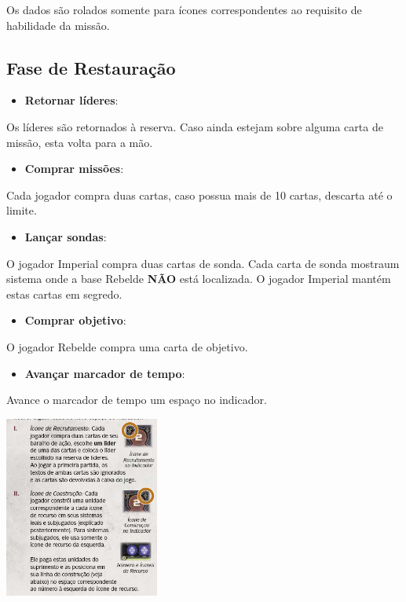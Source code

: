\documentclass[11pt]{article}
\begin{document}
Os dados são rolados somente para ícones correspondentes ao requisito de habilidade da missão.

\subsection{Fase de Restauração}
\label{sec:org5829e97}

\begin{itemize}
\item \textbf{Retornar líderes}:
\end{itemize}

Os líderes são retornados à reserva. Caso ainda estejam sobre alguma carta de missão, esta volta para a mão.

\begin{itemize}
\item \textbf{Comprar missões}:
\end{itemize}

Cada jogador compra duas cartas, caso possua mais de 10 cartas, descarta até o limite.

\begin{itemize}
\item \textbf{Lançar sondas}:
\end{itemize}

O jogador Imperial compra duas cartas de sonda. Cada carta de sonda mostraum sistema onde a base Rebelde \textbf{NÃO} está localizada. O jogador Imperial mantém estas cartas em segredo.

\begin{itemize}
\item \textbf{Comprar objetivo}:
\end{itemize}

O jogador Rebelde compra uma carta de objetivo.

\begin{itemize}
\item \textbf{Avançar marcador de tempo}:
\end{itemize}

Avance o marcador de tempo um espaço no indicador.

\begin{center}
\includegraphics[width=2.0in]{./time-marker.png}
\end{center}
\end{document}
